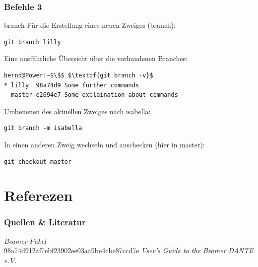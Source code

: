 \documentclass{beamer}
\begin{document}
\begin{frame}[fragile]\frametitle{Befehle 3}
\begin{block} {branch}
Für die Erstellung eines neuen Zweiges (branch):
\begin{lstlisting}
git branch lilly
\end{lstlisting}

Eine ausführliche Übersicht über die vorhandenen Branches:
\begin{lstlisting}[mathescape=true]
bernd@Power:~$\$$ $\textbf{git branch -v}$
* lilly  98a74d9 Some further commands
  master e2694e7 Some explaination about commands
\end{lstlisting} %

Umbenenen des aktuellen Zweiges nach isabella:
\begin{lstlisting}
git branch -m isabella
\end{lstlisting}

In einen anderen Zweig wechseln und auschecken (hier in master):
\begin{lstlisting}
git checkout master
\end{lstlisting}

\end{block}
\end{frame}

\section[Quellen]{Referezen}
\begin{frame}\frametitle{Quellen \& Literatur}

\begin{thebibliography}{9}
 \emph{Beamer Paket} \\ 
98a74d912af7ebf23902ee03aa9be4cbe87ccd7e
 \emph{User's Guide to the Beamer} 
 \emph{DANTE e.V.}    
\end{thebibliography}


\end{frame}
\end{document}
